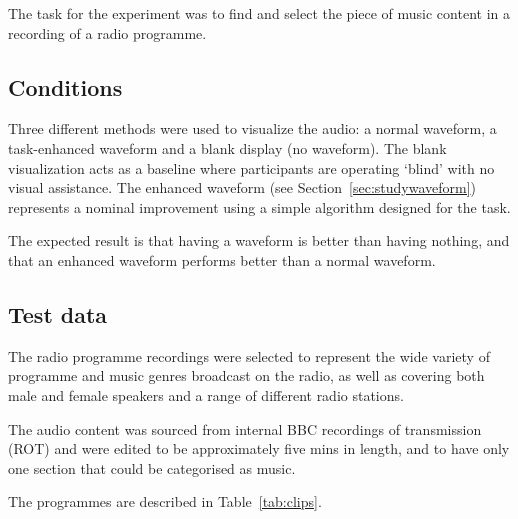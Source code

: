 The task for the experiment was to find and select the piece of music content
in a recording of a radio programme.

\subsection{Conditions}
Three different methods were used to visualize the audio: a normal waveform, a
task-enhanced waveform and a blank display (no waveform). The blank
visualization acts as a baseline where participants are operating `blind' with
no visual assistance. The enhanced waveform (see
Section~\ref{sec:studywaveform}) represents a nominal improvement using a
simple algorithm designed for the task.

The expected result is that having a waveform is better than having nothing,
and that an enhanced waveform performs better than a normal waveform.

\subsection{Test data}
The radio programme recordings were selected to represent the wide variety of
programme and music genres broadcast on the radio, as well as covering both
male and female speakers and a range of different radio stations.

The audio content was sourced from internal BBC recordings of transmission
(ROT) and were edited to be approximately five mins in length, and to have only
one section that could be categorised as music.

The programmes are described in Table~\ref{tab:clips}.

